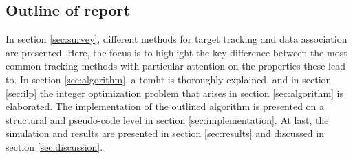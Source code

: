 \subsection{Outline of report}
In section \ref{sec:survey}, different methods for target tracking and data association are presented. Here, the focus is to highlight the key difference between the most common tracking methods with particular attention on the properties these lead to. In section \ref{sec:algorithm}, a \gls{tomht} is thoroughly explained, and in section \ref{sec:ilp} the integer optimization problem that arises in section \ref{sec:algorithm} is elaborated. The implementation of the outlined algorithm is presented on a structural and pseudo-code level in section \ref{sec:implementation}. At last, the simulation and results are presented in section \ref{sec:results} and discussed in section \ref{sec:discussion}.